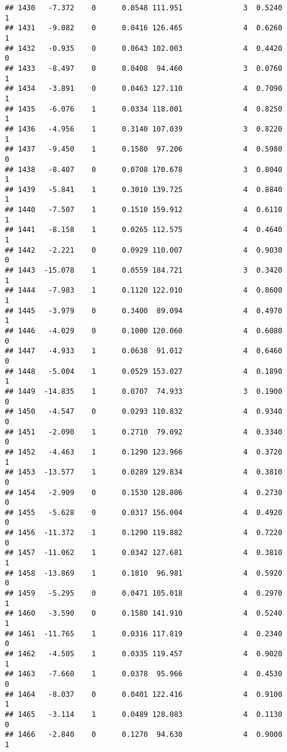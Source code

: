 \documentclass[
]{article}
\begin{document}
\begin{verbatim}
## 1430   -7.372    0      0.0548 111.951              3  0.5240      1
## 1431   -9.082    0      0.0416 126.465              4  0.6260      1
## 1432   -0.935    0      0.0643 102.003              4  0.4420      0
## 1433   -8.497    0      0.0408  94.460              3  0.0760      1
## 1434   -3.891    0      0.0463 127.110              4  0.7090      1
## 1435   -6.076    1      0.0334 118.001              4  0.8250      1
## 1436   -4.956    1      0.3140 107.039              3  0.8220      1
## 1437   -9.450    1      0.1580  97.206              4  0.5980      0
## 1438   -8.407    0      0.0708 170.678              3  0.8040      1
## 1439   -5.841    1      0.3010 139.725              4  0.8840      1
## 1440   -7.507    1      0.1510 159.912              4  0.6110      1
## 1441   -8.158    1      0.0265 112.575              4  0.4640      1
## 1442   -2.221    0      0.0929 110.007              4  0.9030      0
## 1443  -15.078    1      0.0559 184.721              3  0.3420      1
## 1444   -7.983    1      0.1120 122.010              4  0.8600      1
## 1445   -3.979    0      0.3400  89.094              4  0.4970      1
## 1446   -4.029    0      0.1000 120.060              4  0.6080      0
## 1447   -4.933    1      0.0638  91.012              4  0.6460      0
## 1448   -5.004    1      0.0529 153.027              4  0.1890      1
## 1449  -14.835    1      0.0707  74.933              3  0.1900      0
## 1450   -4.547    0      0.0293 110.832              4  0.9340      0
## 1451   -2.090    1      0.2710  79.092              4  0.3340      0
## 1452   -4.463    1      0.1290 123.966              4  0.3720      1
## 1453  -13.577    1      0.0289 129.834              4  0.3810      0
## 1454   -2.909    0      0.1530 128.806              4  0.2730      0
## 1455   -5.628    0      0.0317 156.004              4  0.4920      0
## 1456  -11.372    1      0.1290 119.882              4  0.7220      0
## 1457  -11.062    1      0.0342 127.681              4  0.3810      1
## 1458  -13.869    1      0.1810  96.981              4  0.5920      0
## 1459   -5.295    0      0.0471 105.018              4  0.2970      1
## 1460   -3.590    0      0.1580 141.910              4  0.5240      1
## 1461  -11.765    1      0.0316 117.819              4  0.2340      0
## 1462   -4.505    1      0.0335 119.457              4  0.9020      1
## 1463   -7.660    1      0.0378  95.966              4  0.4530      0
## 1464   -8.037    0      0.0401 122.416              4  0.9100      1
## 1465   -3.114    1      0.0489 128.083              4  0.1130      0
## 1466   -2.840    0      0.1270  94.630              4  0.9000      1

\end{verbatim}
\end{document}
